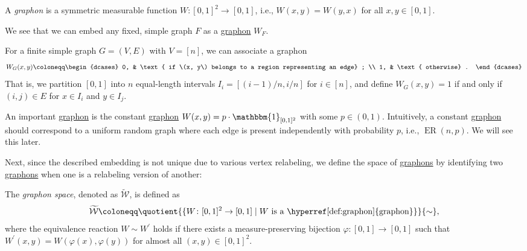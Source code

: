 \begin{definition}[Graphon]\label{def:graphon}
	A \emph{graphon} is a symmetric measurable function \(W \colon [0, 1]^2 \to [0, 1]\), i.e., \(W(x, y) = W(y, x)\) for all \(x, y \in [0, 1]\).
\end{definition}

We see that we can embed any fixed, simple graph \(F\) as a \hyperref[def:graphon]{graphon} \(W_F\).

\begin{eg}
	For a finite simple graph \(G = (V, E)\) with \(V = [n]\), we can associate a graphon
	\[
		W_G(x, y)
		\coloneqq \begin{dcases}
			0, & \text{ if \(x, y\) belongs to a region representing an edge} ; \\
			1, & \text{ otherwise} .
		\end{dcases}
	\]
	That is, we partition \([0, 1]\) into \(n\) equal-length intervals \(I_i = [(i-1) / n, i / n]\) for \(i \in [n]\), and define \(W_G(x, y) = 1\) if and only if \((i, j) \in E\) for \(x \in I_i\) and \(y \in I_j\).
\end{eg}

\begin{eg}
	An important \hyperref[def:graphon]{graphon} is the constant \hyperref[def:graphon]{graphon} \(W(x, y) = p\cdot \mathbbm{1}_{[0, 1]^2} \) with some \(p \in (0, 1)\). Intuitively, a constant \hyperref[def:graphon]{graphon} should correspond to a uniform random graph where each edge is present independently with probability \(p\), i.e., \(\operatorname{ER}(n, p) \). We will see this later.
\end{eg}

Next, since the described embedding is not unique due to various vertex relabeling, we define the space of \hyperref[def:graphon]{graphons} by identifying two \hyperref[def:graphon]{graphons} when one is a relabeling version of another:

\begin{definition}\label{def:graphon-space}
	The \emph{graphon space}, denoted as \(\widetilde{\mathcal{W} } \), is defined as
	\[
		\widetilde{\mathcal{W} }
		\coloneqq \quotient{\{ W\colon [0, 1]^2 \to [0, 1] \mid W \text{ is a \hyperref[def:graphon]{graphon}} \}}{\sim } ,
	\]
	where the equivalence reaction \(W \sim W^{\prime} \) holds if there exists a measure-preserving bijection \(\varphi \colon [0, 1] \to [0, 1]\) such that \(W^{\prime} (x, y) = W(\varphi (x), \varphi (y))\) for almost all \((x, y) \in [0, 1]^2\).
\end{definition}

